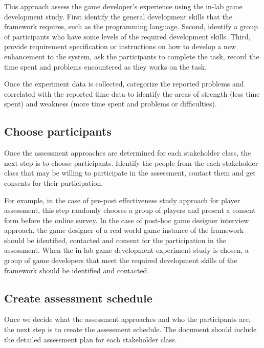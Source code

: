 \label{In-lab game development study}

This approach assess the game developer's experience using the in-lab game development study.  
First identify the general development skills that the framework requires, such as the programming language. 
Second, identify a group of participants who have some levels of the required development skills. Third, provide 
requirement specification or instructions on how to develop a new enhancement to the system, ask the 
participants to complete the task, record the time spent and problems encountered as they works on the task.

Once the experiment data is collected, categorize the reported problems and correlated with the reported time data 
to identify the areas of strength (less time spent) and weakness (more time spent and problems or difficulties). 

\subsection {Choose participants}

Once the assessment approaches are determined for each stakeholder class, the next step is to choose participants. 
Identify the  people from the each stakeholder class that may be willing to participate in the assessment, contact them 
and get consents for their participation. 

For example, in the case of pre-post effectiveness study approach for player assessment, this step randomly chooses a 
group of players and present a consent form before the online survey.  In the case of post-hoc game designer interview 
approach, the game designer of a real world game instance of the framework should be identified, contacted and consent 
for the participation in the assessment. When the in-lab game development experiment study is chosen, a group of game 
developers that meet the required development skills of the framework should be identified and contacted.

\subsection{Create assessment schedule}

Once we decide what the assessment approaches and who the participants are, the next step is to create the assessment 
schedule. The document should include the detailed assessment plan for 
each stakeholder class. 


